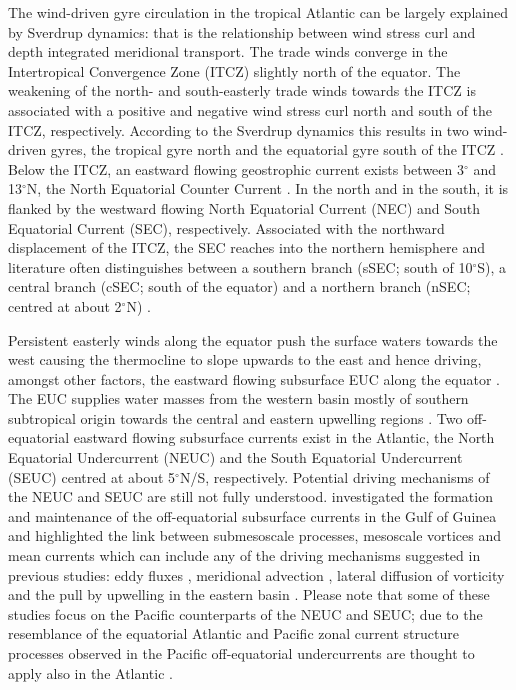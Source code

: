 \documentclass[os, manuscript]{copernicus}
\begin{document}
	The wind-driven gyre circulation in the tropical Atlantic can be largely explained by Sverdrup dynamics: that is the relationship between wind stress curl and depth integrated meridional transport. The trade winds converge in the Intertropical Convergence Zone (ITCZ) slightly north of the equator. The weakening of the north- and south-easterly trade winds towards the ITCZ is associated with a positive and negative wind stress curl north and south of the ITCZ, respectively. According to the Sverdrup dynamics this results in two wind-driven gyres, the tropical gyre north and the equatorial gyre south of the ITCZ \cite[e.g.,][]{Fratantoni2000}. Below the ITCZ, an eastward flowing geostrophic current exists between 3$^{\circ}$ and 13$^{\circ}$N, the North Equatorial Counter Current \citep[Fig. \ref{fig_mean_curl};][]{Urbano2006}. In the north and in the south, it is flanked by the westward flowing North Equatorial Current (NEC) and South Equatorial Current (SEC), respectively. Associated with the northward displacement of the ITCZ, the SEC reaches into the northern hemisphere and literature often distinguishes between a southern branch (sSEC; south of 10$^{\circ}$S), a central branch (cSEC; south of the equator) and a northern branch (nSEC; centred at about 2$^{\circ}$N) \cite[e.g.][]{Peterson1991,Schott2004}. 
	
	Persistent easterly winds along the equator push the surface waters towards the west causing the thermocline to slope upwards to the east and hence driving, amongst other factors, the eastward flowing subsurface EUC along the equator \citep{Pedlosky1987,Wacongne1989}. The EUC supplies water masses from the western basin mostly of southern subtropical origin towards the central and eastern upwelling regions \citep[e.g.][]{Bourles2002,Schott2004,Brandt2006}. Two off-equatorial eastward flowing subsurface currents exist in the Atlantic, the North Equatorial Undercurrent (NEUC) and the South Equatorial Undercurrent (SEUC) centred at about 5$^{\circ}$N/S, respectively. Potential driving mechanisms of the NEUC and SEUC are still not fully understood. \cite{Assene2020} investigated the formation and maintenance of the off-equatorial subsurface currents in the Gulf of Guinea and highlighted the link between submesoscale processes, mesoscale vortices and mean currents which can include any of the driving mechanisms suggested in previous studies: eddy fluxes \citep{Jochum2004b}, meridional advection \citep{Wang2005,Johnson1997,Marin2000,Hua2003,Marin2003,Ishida2005}, lateral diffusion of vorticity \citep{McPhaden1984} and the pull by upwelling in the eastern basin \citep{McCreary2002a,Furue2007,Furue2009}. Please note that some of these studies focus on the Pacific counterparts of the NEUC and SEUC; due to the resemblance of the equatorial Atlantic and Pacific zonal current structure \citep[e.g.][]{Schott2004} processes observed in the Pacific off-equatorial undercurrents are thought to apply also in the Atlantic \citep{Assene2020}.
	
\end{document}
